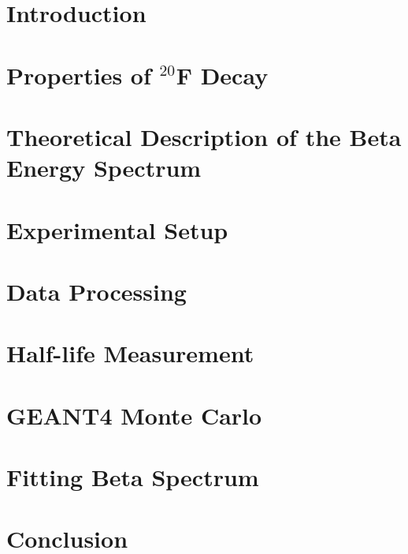 \documentclass{msuphddissertation}
\begin{document}
\newpage
{}
\begin{doublespace}

\chapter{Introduction}


\chapter{Properties of $^{20}$F Decay} 


\chapter{Theoretical Description of the Beta Energy Spectrum}
\label{ch:theory}


\chapter{Experimental Setup}


\chapter{Data Processing}


\chapter{Half-life Measurement}


\chapter{GEANT4 Monte Carlo}


\chapter{Fitting Beta Spectrum}


\chapter{Conclusion}

\end{doublespace}
\end{document}
